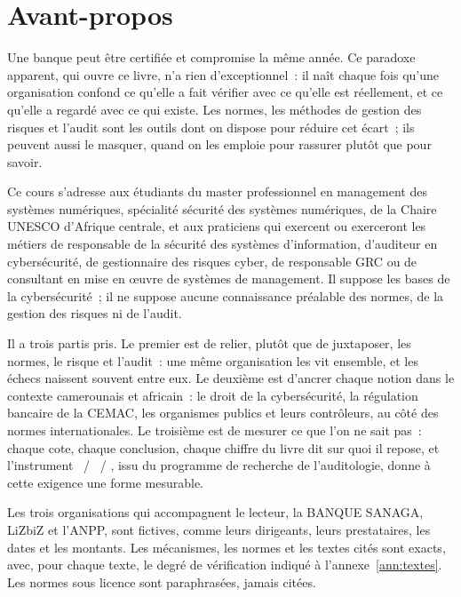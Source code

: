 
\chapter*{Avant-propos}

Une banque peut être certifiée et compromise la même année. Ce paradoxe
apparent, qui ouvre ce livre, n'a rien d'exceptionnel~: il naît chaque fois
qu'une organisation confond ce qu'elle a fait vérifier avec ce qu'elle est
réellement, et ce qu'elle a regardé avec ce qui existe. Les normes, les
méthodes de gestion des risques et l'audit sont les outils dont on dispose
pour réduire cet écart~; ils peuvent aussi le masquer, quand on les emploie
pour rassurer plutôt que pour savoir.

Ce cours s'adresse aux étudiants du master professionnel en management des
systèmes numériques, spécialité sécurité des systèmes numériques, de la
Chaire UNESCO d'Afrique centrale, et aux praticiens qui exercent ou
exerceront les métiers de responsable de la sécurité des systèmes
d'information, d'auditeur en cybersécurité, de gestionnaire des risques
cyber, de responsable GRC ou de consultant en mise en œuvre de systèmes de
management. Il suppose les bases de la cybersécurité~; il ne suppose aucune
connaissance préalable des normes, de la gestion des risques ni de l'audit.

Il a trois partis pris. Le premier est de relier, plutôt que de juxtaposer,
les normes, le risque et l'audit~: une même organisation les vit ensemble,
et les échecs naissent souvent entre eux. Le deuxième est d'ancrer chaque
notion dans le contexte camerounais et africain~: le droit de la
cybersécurité, la régulation bancaire de la CEMAC, les organismes publics
et leurs contrôleurs, au côté des normes internationales. Le troisième est
de mesurer ce que l'on ne sait pas~: chaque cote, chaque conclusion, chaque
chiffre du livre dit sur quoi il repose, et l'instrument \OUI{}~/ \NON{}~/
\NEK{}, issu du programme de recherche de l'auditologie, donne à cette
exigence une forme mesurable.

Les trois organisations qui accompagnent le lecteur, la BANQUE SANAGA,
LiZbiZ et l'ANPP, sont fictives, comme leurs dirigeants, leurs prestataires,
les dates et les montants. Les mécanismes, les normes et les textes cités
sont exacts, avec, pour chaque texte, le degré de vérification indiqué à
l'annexe~\ref{ann:textes}. Les normes sous licence sont paraphrasées, jamais
citées.

